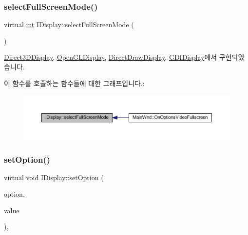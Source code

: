 \subsubsection{\texorpdfstring{select\+Full\+Screen\+Mode()}{selectFullScreenMode()}}
{\footnotesize\ttfamily virtual \mbox{\hyperlink{_util_8cpp_a0ef32aa8672df19503a49fab2d0c8071}{int}} I\+Display\+::select\+Full\+Screen\+Mode (\begin{DoxyParamCaption}\item[{G\+U\+ID $\ast$$\ast$}]{ }\end{DoxyParamCaption})\hspace{0.3cm}{\ttfamily [pure virtual]}}



\mbox{\hyperlink{class_direct3_d_display_a46be4b83a670d9d29cef2e7131ed46ae}{Direct3\+D\+Display}}, \mbox{\hyperlink{class_open_g_l_display_aade9c3229c9fc024ad55b3d1419499e8}{Open\+G\+L\+Display}}, \mbox{\hyperlink{class_direct_draw_display_a10d4f6b14b3f4de2edb60e05a4277d25}{Direct\+Draw\+Display}}, \mbox{\hyperlink{class_g_d_i_display_ace69c8ae01b3842aebfabb4f008c529d}{G\+D\+I\+Display}}에서 구현되었습니다.

이 함수를 호출하는 함수들에 대한 그래프입니다.\+:
\nopagebreak
\begin{figure}[H]
\begin{center}
\leavevmode
\includegraphics[width=350pt]{class_i_display_a2f7a55f63c5e4b24245aa88228afab68_icgraph}
\end{center}
\end{figure}
\mbox{\label{class_i_display_a1766244708c252bb8781892c76c20ba9}} 
\subsubsection{\texorpdfstring{set\+Option()}{setOption()}}
{\footnotesize\ttfamily virtual void I\+Display\+::set\+Option (\begin{DoxyParamCaption}\item[{\mbox{\hyperlink{getopt1_8c_a2c212835823e3c54a8ab6d95c652660e}{const}} char $\ast$}]{option,  }\item[{\mbox{\hyperlink{_util_8cpp_a0ef32aa8672df19503a49fab2d0c8071}{int}}}]{value }\end{DoxyParamCaption})\hspace{0.3cm}{\ttfamily [inline]}, {\ttfamily [virtual]}}



